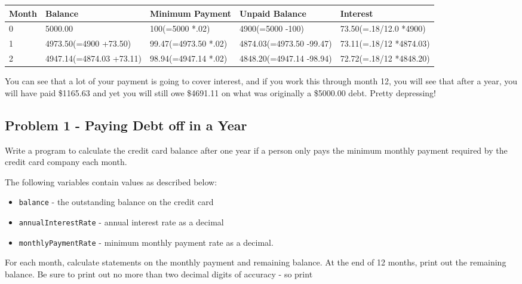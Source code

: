 \documentclass{article}
\begin{document}
\begin{table}[H]
  \centering

  \begin{tabular}{ | m{1cm} | m{3cm} | m{3cm} | m{3cm} | m{3cm} | }
    \hline
    Month & Balance & Minimum Payment & Unpaid Balance & Interest \\
    \hline
    0   & 5000.00 & 100(=5000 *.02) & 4900(=5000 -100) & 73.50(=.18/12.0 *4900)\\
    \hline
    1 & 4973.50(=4900 +73.50) & 99.47(=4973.50 *.02) & 4874.03(=4973.50 -99.47) & 73.11(=.18/12 *4874.03)\\
    \hline
    2 & 4947.14(=4874.03 +73.11) & 98.94(=4947.14 *.02) & 4848.20(=4947.14 -98.94) & 72.72(=.18/12 *4848.20)\\
    \hline
  \end{tabular}

\end{table}
  You can see that a lot of your payment is going to cover interest, and if you
  work this through month 12, you will see that after a year, you will have paid
  \$1165.63 and yet you will still owe \$4691.11 on what was originally a \$5000.00
  debt. Pretty depressing!

  \subsection*{Problem 1 - Paying Debt off in a Year }
  Write a program to calculate the credit card balance after one year if a
  person only pays the minimum monthly payment required by the credit card
  company each month.

  The following variables contain values as described below:
  \begin{itemize}

    \item \verb|balance| - the outstanding balance on the credit card
    \item \verb|annualInterestRate| - annual interest rate as a decimal
    \item \verb|monthlyPaymentRate| - minimum monthly payment rate as a decimal.

    \end{itemize}

  For each month, calculate statements on the monthly payment and remaining
  balance. At the end of 12 months, print out the remaining balance. Be sure to
  print out no more than two decimal digits of accuracy - so print
\end{document}

